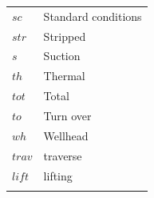 \documentclass[11pt]{report}
\begin{document}
\begin{scriptsize}
\begin{supertabular*}{1\columnwidth}{p{0.2\columnwidth}p{0.75\columnwidth}}
$sc$ & Standard conditions\\
$str$ & Stripped\\
$s$ & Suction\\
$th$ & Thermal\\
$tot$ & Total\\
$to$ & Turn over\\
$wh$ & Wellhead\\
$trav$ & traverse\\
$lift$ & lifting\\
\\
\end{supertabular*}
\end{scriptsize}


\end{document}
